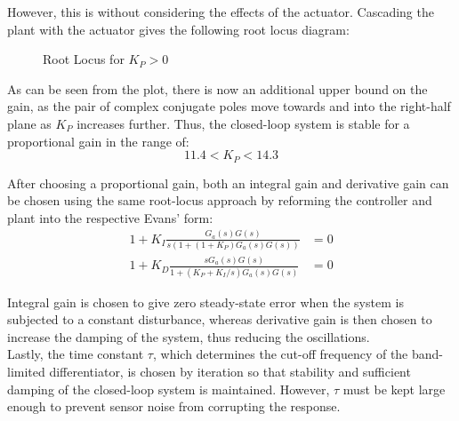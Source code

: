 However, this is without considering the effects of the actuator. Cascading the plant with the actuator gives the following root locus diagram:

\begin{figure}[H]
	\centering
	\caption{Root Locus for $K_P > 0$}
\end{figure}

As can be seen from the plot, there is now an additional upper bound on the gain, as the pair of complex conjugate poles move towards and into the right-half plane as $K_P$ increases further. Thus, the closed-loop system is stable for a proportional gain in the range of:
\begin{equation*}
11.4 < K_P < 14.3
\end{equation*}

After choosing a proportional gain, both an integral gain and derivative gain can be chosen using the same root-locus approach by reforming the controller and plant into the respective Evans' form:
\begin{align*}
1 + K_I \frac{G_a(s) G(s)}{s (1 + (1 + K_P) G_a(s) G(s))} &= 0 \\
1 + K_D \frac{s G_a(s) G(s)}{1 + (K_P + K_I/s) G_a(s) G(s)} &= 0
\end{align*}

Integral gain is chosen to give zero steady-state error when the system is subjected to a constant disturbance, whereas derivative gain is then chosen to increase the damping of the system, thus reducing the oscillations. \\

Lastly, the time constant $\tau$, which determines the cut-off frequency of the band-limited differentiator, is chosen by iteration so that stability and sufficient damping of the closed-loop system is maintained. However, $\tau$ must be kept large enough to prevent sensor noise from corrupting the response. \\

